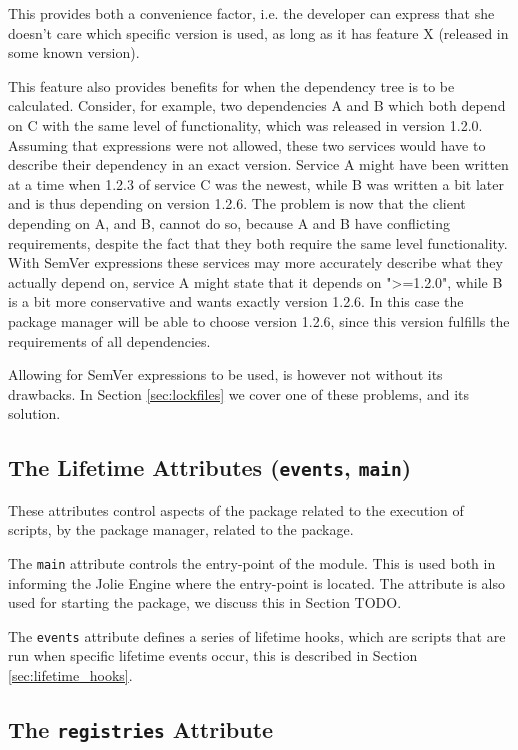 This provides both a convenience factor, i.e. the developer can express that
she doesn't care which specific version is used, as long as it has feature X
(released in some known version).

This feature also provides benefits for when the dependency tree is to be
calculated. Consider, for example, two dependencies A and B which both depend
on C with the same level of functionality, which was released in version 1.2.0.
Assuming that expressions were not allowed, these two services would have to
describe their dependency in an exact version. Service A might have been
written at a time when 1.2.3 of service C was the newest, while B was written a
bit later and is thus depending on version 1.2.6. The problem is now that the
client depending on A, and B, cannot do so, because A and B have conflicting
requirements, despite the fact that they both require the same level
functionality. With SemVer expressions these services may more accurately
describe what they actually depend on, service A might state that it depends on
">=1.2.0", while B is a bit more conservative and wants exactly version 1.2.6.
In this case the package manager will be able to choose version 1.2.6, since
this version fulfills the requirements of all dependencies.

Allowing for SemVer expressions to be used, is however not without its
drawbacks. In Section \ref{sec:lockfiles} we cover one of these problems, and
its solution.

\subsection{The Lifetime Attributes ({\tt events}, {\tt main})}

These attributes control aspects of the package related to the execution of
scripts, by the package manager, related to the package.

The \texttt{main} attribute controls the entry-point of the module.
This is used both in informing the Jolie Engine where the entry-point is
located. The attribute is also used for starting the package, we discuss this
in Section TODO.

The \texttt{events} attribute defines a series of lifetime hooks,
which are scripts that are run when specific lifetime events occur, this is
described in Section \ref{sec:lifetime_hooks}.

\subsection{The {\tt registries} Attribute}


